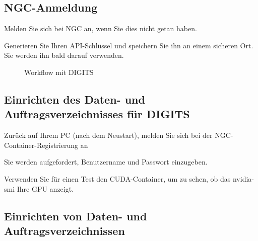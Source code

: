 \medskip


\subsection{NGC-Anmeldung}

Melden Sie sich bei NGC an, wenn Sie dies nicht getan haben.

\medskip


\medskip

Generieren Sie Ihren API-Schlüssel und speichern Sie ihn an einem sicheren Ort. Sie werden ihn bald darauf verwenden.




\begin{figure}
  \caption{Workflow mit DIGITS}
\end{figure}


\subsection{Einrichten des Daten- und Auftragsverzeichnisses für DIGITS}

Zurück auf Ihrem PC (nach dem Neustart), melden Sie sich bei der NGC-Container-Registrierung an

\medskip



\medskip

Sie werden aufgefordert, Benutzername und Passwort einzugeben.

\medskip



\medskip


Verwenden Sie für einen Test den CUDA-Container, um zu sehen, ob das nvidia-smi Ihre GPU anzeigt.


\medskip


\medskip

\subsection{Einrichten von Daten- und Auftragsverzeichnissen}


